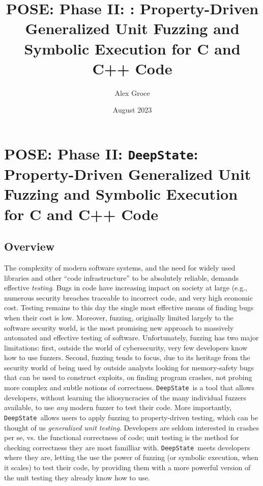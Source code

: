 \documentclass[numbers]{proposalnsf}
\title{POSE: Phase II: \ds: Property-Driven Generalized Unit Fuzzing and Symbolic Execution for C and C++ Code}
\author{Alex Groce }
\date{August 2023}
\newcommand{\ds}{\texttt{DeepState}}
\begin{document}
\section*{POSE: Phase II: \ds: Property-Driven Generalized Unit Fuzzing and Symbolic Execution for C and C++ Code}

\subsection*{Overview}
\vspace{-2mm}


The complexity of modern software systems, and the need for widely used libraries and other ``code infrastructure'' to be absolutely reliable, demands effective \emph{testing}.  Bugs in code have increasing impact on society at large (e.g., numerous security breaches traceable to incorrect code, and very high economic cost.  Testing remains to this day the single most effective means of finding bugs when their cost is low.   Moreover, fuzzing, originally limited largely to the software security world, is the most promising new approach to massively automated and effective testing of software.  Unfortunately, fuzzing has two major limitations: first, outside the world of cybersecurity, very few developers know how to use fuzzers.  Second, fuzzing tends to focus, due to its heritage from the security world of being used by outside analysts looking for memory-safety bugs that can be used to construct exploits, on finding program crashes, not probing more complex and subtle notions of correctness.  \ds\ is a tool that allows developers, without learning the idiosyncracies of the many individual fuzzers available, to use \emph{any} modern fuzzer to test their code.  More importantly, \ds\ allows users to apply fuzzing to property-driven testing, which can be thought of us \emph{generalized unit testing}.  Developers are seldom interested in crashes per se, vs. the functional correctness of code; unit testing is the method for checking correctness they are most familliar with.  \ds\ meets developers where they are, letting the use the power of fuzzing (or symbolic execution, when it scales) to test their code, by providing them with a more powerful version of the unit testing they already know how to use.
\end{document}
